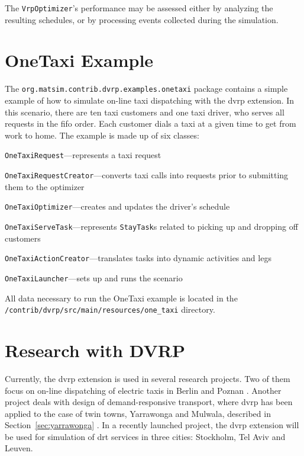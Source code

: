 The \lstinline$VrpOptimizer$'s performance may be assessed either by analyzing the resulting schedules, or by processing events collected during the simulation.

\section{OneTaxi Example}
The \lstinline$org.matsim.contrib.dvrp.examples.onetaxi$ package contains a simple example of how to simulate on-line taxi dispatching with the \gls{dvrp} extension. In this scenario, there are ten taxi customers and one taxi driver, who serves all requests in the \gls{fifo} order. Each customer dials a taxi at a given time to get from work to home. The example is made up of six classes:
%
\begin{compactitem}
	\item \lstinline$OneTaxiRequest$---represents a taxi request	
	\item \lstinline$OneTaxiRequestCreator$---converts taxi calls into requests prior to submitting them to the optimizer
	\item \lstinline$OneTaxiOptimizer$---creates and updates the driver's schedule
	\item \lstinline$OneTaxiServeTask$---represents \lstinline$StayTask$s related to picking up and dropping off customers
	\item \lstinline$OneTaxiActionCreator$---translates tasks into dynamic activities and legs
	\item \lstinline$OneTaxiLauncher$---sets up and runs the scenario
\end{compactitem}
%
All data necessary to run the OneTaxi example is located in the \lstinline$/contrib/dvrp/src/main/resources/one_taxi$ directory.

\section{Research with DVRP}
Currently, the \gls{dvrp} extension is used in several research projects. Two of them focus on on-line dispatching of electric taxis in Berlin and Poznan \citep{MaciejewskiNagelOnlineTaxis2, MaciejewskiNagel2013OnlineTaxisVSPWP, MaciejewskiNagel2013CooperationPPAM, Maciejewski2014OnlineViaOffline}. Another project deals with design of demand-responsive transport, where \gls{dvrp} has been applied to the case of twin towns, Yarrawonga and Mulwala, described in Section~\ref{sec:yarrawonga} \citep{RonThoWin2015, ronald14SimulatingDRT}. In a recently launched project, the \gls{dvrp} extension will be used for simulation of \gls{drt} services in three cities: Stockholm, Tel Aviv and Leuven.


